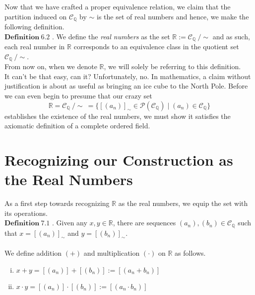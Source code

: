 \documentclass[12pt]{article}
\theoremstyle{definition}
\theoremstyle{remark}
\begin{document}
\noindent Now that we have crafted a proper equivalence relation, we claim that the partition induced on $\mathscr{C}_\mathbb{Q}$ by $\sim$ is the set of real numbers and hence, we make the following definition.\\

\noindent $\mathbf{Definition\ 6.2}$ \cite[pg.507]{new}.
        We define the \textit{real numbers} as the set $\mathbb{R}:=\mathscr{C}_\mathbb{Q}\ /\sim$ and as such, each real number in $\mathbb{R}$ corresponds to an equivalence class in the quotient set $\mathscr{C}_\mathbb{Q}\ /\sim$.\\
        
\noindent From now on, when we denote $\mathbb{R}$, we will solely be referring to this definition.\\

\noindent It can't be that easy, can it? Unfortunately, no. In mathematics, a claim without justification is about as useful as bringing an ice cube to the North Pole. Before we can even begin to presume that our crazy set
$$\mathbb{R}=\mathscr{C}_\mathbb{Q}\ /\sim\ =\{[(a_n)]_\sim\in\mathcal{P}(\mathscr{C}_\mathbb{Q}) \mid (a_n)\in\mathscr{C}_\mathbb{Q}\}$$
establishes the existence of the real numbers, we must show it satisfies the axiomatic definition of a complete ordered field.

        \section{Recognizing our Construction as the Real Numbers}
As a first step towards recognizing $\mathbb{R}$ as the real numbers, we equip the set with its operations.\\

\noindent $\mathbf{Definition\ 7.1}$ \cite[pg.507]{new}.
        Given any $x,y\in\mathbb{R}$, there are sequences $(a_n),(b_n)\in\mathscr{C}_\mathbb{Q}$ such that $x=[(a_n)]_\sim$ and $y=[(b_n)]_\sim$.\\\\ We define addition $(+)$ and multiplication $(\cdot)$ on $\mathbb{R}$ as follows.
                \begin{enumerate}[(i)]
            \item $x+y=[(a_n)]+[(b_n)]:=[(a_n+b_n)]$
            \item $x\cdot y=[(a_n)]\cdot [(b_n)]:=[(a_n\cdot b_n)]$\\
        \end{enumerate}
\end{document}
